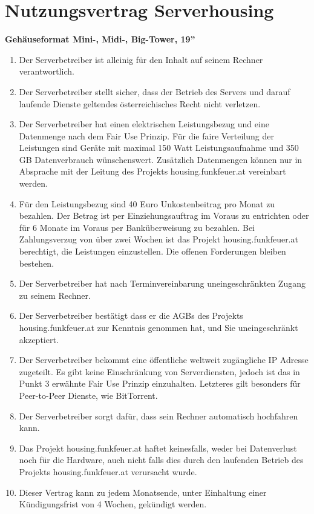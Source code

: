 \documentclass[parskip=half]{scrreprt}
\begin{document}
\chapter*{Nutzungsvertrag Serverhousing}
\vspace{-0.8cm}
\textbf{Gehäuseformat Mini-, Midi-, Big-Tower, 19''\\}


\begin{contract}
\begin{enumerate}
\item Der Serverbetreiber ist alleinig für den Inhalt auf seinem Rechner verantwortlich.
\item Der Serverbetreiber stellt sicher, dass der Betrieb des Servers und darauf laufende Dienste geltendes österreichisches Recht nicht verletzen.
\item Der Serverbetreiber hat einen elektrischen Leistungsbezug und eine Datenmenge nach dem Fair Use Prinzip. Für die faire Verteilung der Leistungen sind Geräte mit maximal 150 Watt Leistungsaufnahme und 350 GB Datenverbrauch wünschenswert. Zusätzlich Datenmengen können nur in Absprache mit der Leitung des Projekts housing.funkfeuer.at vereinbart werden.
\item Für den Leistungsbezug sind 40 Euro Unkostenbeitrag pro Monat zu bezahlen. Der Betrag ist per Einziehungsauftrag im Voraus zu entrichten oder für 6 Monate im Voraus per Banküberweisung zu bezahlen. Bei Zahlungsverzug von über zwei Wochen ist das Projekt housing.funkfeuer.at berechtigt, die Leistungen einzustellen. Die offenen Forderungen bleiben bestehen.
\item Der Serverbetreiber hat nach Terminvereinbarung uneingeschränkten Zugang zu seinem Rechner.
\item Der Serverbetreiber bestätigt dass er die AGBs des Projekts housing.funkfeuer.at zur Kenntnis genommen hat, und Sie uneingeschränkt akzeptiert.
\item Der Serverbetreiber bekommt eine öffentliche weltweit zugängliche IP Adresse zugeteilt. Es gibt keine Einschränkung von Serverdiensten, jedoch ist das in Punkt 3 erwähnte Fair Use Prinzip einzuhalten. Letzteres gilt besonders für Peer-to-Peer Dienste, wie BitTorrent.
\item Der Serverbetreiber sorgt dafür, dass sein Rechner automatisch hochfahren kann.
\item Das Projekt housing.funkfeuer.at haftet keinesfalls, weder bei Datenverlust noch für die Hardware, auch nicht falls dies durch den laufenden Betrieb des Projekts housing.funkfeuer.at verursacht wurde.
\item Dieser Vertrag kann zu jedem Monatsende, unter Einhaltung einer Kündigungsfrist von 4 Wochen, gekündigt werden.
\end{enumerate}
\end{contract}




\end{document}
